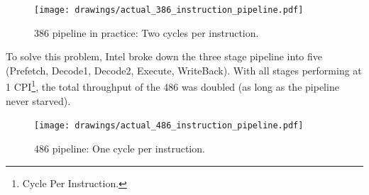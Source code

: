 \begin{figure}[H]
\centering
\texttt{[image: drawings/actual\_386\_instruction\_pipeline.pdf]}
\caption{386 pipeline in practice: Two cycles per instruction.}
\label{386_real_pipeline}
\end{figure}

\par
To solve this problem, Intel broke down the three stage pipeline into five (Prefetch, Decode1, Decode2, Execute, WriteBack). With all stages performing at 1 CPI\footnote{Cycle Per Instruction.}, the total throughput of the 486 was doubled (as long as the pipeline never starved).\\
\par
\begin{figure}[H]
\centering
\texttt{[image: drawings/actual\_486\_instruction\_pipeline.pdf]}
\caption{486 pipeline: One cycle per instruction.}
\end{figure}
\par





